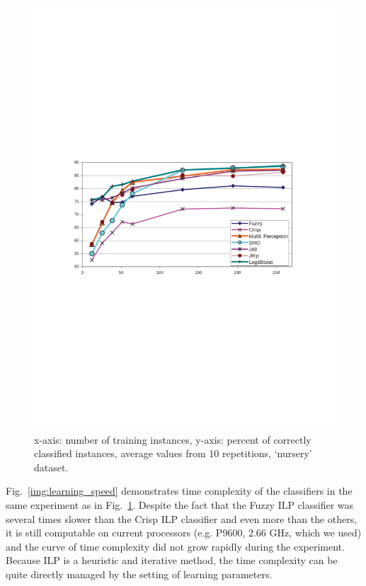 \begin{figure}
\centerline{\includegraphics[width=0.8\hsize]{corect_growing_learninig_instances}}
\caption{x-axis: number of training instances, y-axis: percent of correctly classified instances, average values from 10 repetitions, `nursery' dataset.}
\label{img:corect_growing_learninig_instances}
\end{figure}

Fig.~\ref{img:learning_speed} demonstrates time complexity of the classifiers in the same experiment as in Fig.~\ref{img:corect_growing_learninig_instances}. Despite the fact that the Fuzzy ILP classifier was several times slower than the Crisp ILP classifier and even more than the others, it is still computable on current processors (e.g. P9600, 2.66 GHz, which we used) and the curve of time complexity did not grow rapidly during the experiment. Because ILP is a heuristic and iterative method, the time complexity can be quite directly managed by the setting of learning parameters.

